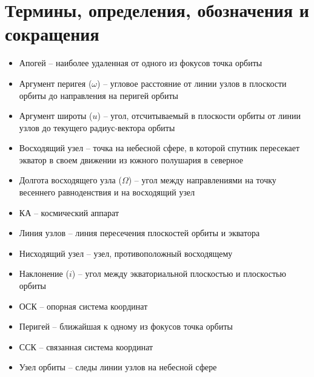 \chapter{Термины, определения, обозначения и сокращения}
\begin{itemize}
    \item Апогей -- наиболее удаленная от одного из фокусов точка орбиты
    \item Аргумент перигея ($\omega$) -- угловое расстояние от линии узлов в плоскости
    орбиты до направления на перигей орбиты
    \item Аргумент широты ($u$) -- угол, отсчитываемый в плоскости орбиты от линии
    узлов до текущего радиус-вектора орбиты
    \item Восходящий узел -- точка на небесной сфере, в которой спутник пересекает
    экватор в своем движении из южного полушария в северное
    \item Долгота восходящего узла ($\Omega$) -- угол между направлениями на точку весеннего
    равноденствия и на восходящий узел
    \item КА -- космический аппарат
    \item Линия узлов -- линия пересечения плоскостей орбиты и экватора
    \item Нисходящий узел -- узел, противоположный восходящему
    \item Наклонение ($i$) -- угол между экваториальной плоскостью и плоскостью орбиты
    \item ОСК -- опорная система координат
    \item Перигей -- ближайшая к одному из фокусов точка орбиты
    \item ССК -- связанная система координат
    \item Узел орбиты -- следы линии узлов на небесной сфере
\end{itemize}
\newpage
